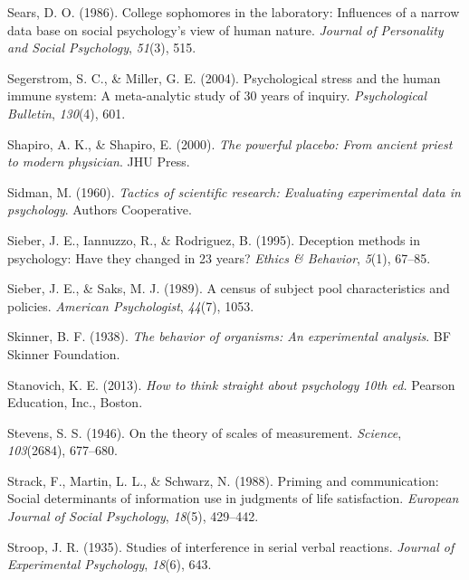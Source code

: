 \documentclass[
]{krantz}
\newlength{\cslhangindent}
\newenvironment{CSLReferences}[2] %
 {\begin{list}{}{%
  \setlength{\itemindent}{0pt}
  \setlength{\leftmargin}{0pt}
  \setlength{\parsep}{0pt}
  \ifodd #1
   \setlength{\leftmargin}{\cslhangindent}
   \setlength{\itemindent}{-1\cslhangindent}
  \fi
  \setlength{\itemsep}{#2\baselineskip}}}
 {\end{list}}
\begin{document}
\begin{CSLReferences}{1}{0}
Sears, D. O. (1986). College sophomores in the laboratory: Influences of a narrow data base on social psychology's view of human nature. \emph{Journal of Personality and Social Psychology}, \emph{51}(3), 515.

Segerstrom, S. C., \& Miller, G. E. (2004). Psychological stress and the human immune system: A meta-analytic study of 30 years of inquiry. \emph{Psychological Bulletin}, \emph{130}(4), 601.

Shapiro, A. K., \& Shapiro, E. (2000). \emph{The powerful placebo: From ancient priest to modern physician}. JHU Press.

Sidman, M. (1960). \emph{Tactics of scientific research: Evaluating experimental data in psychology}. Authors Cooperative.

Sieber, J. E., Iannuzzo, R., \& Rodriguez, B. (1995). Deception methods in psychology: Have they changed in 23 years? \emph{Ethics \& Behavior}, \emph{5}(1), 67--85.

Sieber, J. E., \& Saks, M. J. (1989). A census of subject pool characteristics and policies. \emph{American Psychologist}, \emph{44}(7), 1053.

Skinner, B. F. (1938). \emph{The behavior of organisms: An experimental analysis}. BF Skinner Foundation.

Stanovich, K. E. (2013). \emph{How to think straight about psychology 10th ed.} Pearson Education, Inc., Boston.

Stevens, S. S. (1946). On the theory of scales of measurement. \emph{Science}, \emph{103}(2684), 677--680.

Strack, F., Martin, L. L., \& Schwarz, N. (1988). Priming and communication: Social determinants of information use in judgments of life satisfaction. \emph{European Journal of Social Psychology}, \emph{18}(5), 429--442.

Stroop, J. R. (1935). Studies of interference in serial verbal reactions. \emph{Journal of Experimental Psychology}, \emph{18}(6), 643.


\end{CSLReferences}
\end{document}
